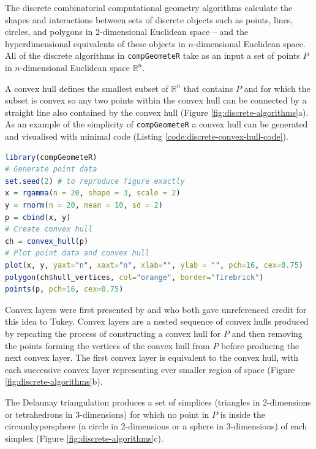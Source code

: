 \documentclass[12pt, a4paper]{article}
\begin{document}
The discrete combinatorial computational geometry algorithms calculate the shapes and interactions between sets of discrete objects such as points, lines, circles, and polygons in 2-dimensional Euclidean space -- and the hyperdimensional equivalents of these objects in $n$-dimensional Euclidean space.  All of the discrete algorithms in \texttt{compGeometeR} take as an input a set of points $P$ in $n$-dimensional Euclidean space $\mathbb{R}^n$.

A convex hull \citep{barber-1996} defines the smallest subset of $\mathbb{R}^n$ that contains $P$ and for which the subset is convex so any two points within the convex hull can be connected by a straight line also contained by the convex hull (Figure \ref{fig:discrete-algorithms}a).  As an example of the simplicity of \texttt{compGeometeR} a convex hull can be generated and visualised with minimal code (Listing \ref{code:discrete-convex-hull-code}).

\begin{lstlisting}[language=R, caption=Example \texttt{R} code to create a discrete convex hull with \texttt{compGeometeR}, label={code:discrete-convex-hull-code}]
library(compGeometeR)
# Generate point data
set.seed(2) # to reproduce figure exactly
x = rgamma(n = 20, shape = 3, scale = 2)
y = rnorm(n = 20, mean = 10, sd = 2)
p = cbind(x, y)
# Create convex hull
ch = convex_hull(p)
# Plot point data and convex hull
plot(x, y, yaxt="n", xaxt="n", xlab="", ylab = "", pch=16, cex=0.75)
polygon(ch$hull_vertices, col="orange", border="firebrick")
points(p, pch=16, cex=0.75)
\end{lstlisting}

Convex layers were first presented by \cite{huber-1972} and \cite{barnett-1976} who both gave unreferenced credit for this idea to Tukey.  Convex layers are a nested sequence of convex hulls produced by repeating the process of constructing a convex hull for $P$ and then removing the points forming the vertices of the convex hull from $P$ before producing the next convex layer.  The first convex layer is equivalent to the convex hull, with each successive convex layer representing ever smaller region of space (Figure \ref{fig:discrete-algorithms}b).

The Delaunay triangulation \citep{delaunay-1934} produces a set of simplices (triangles in 2-dimensions or tetrahedrons in 3-dimensions) for which no point in $P$ is inside the circumhypersphere (a circle in 2-dimensions or a sphere in 3-dimensions) of each simplex (Figure \ref{fig:discrete-algorithms}c).
\end{document}
